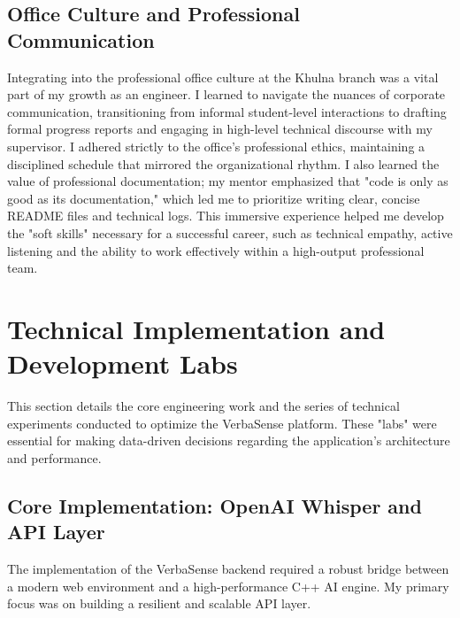 \documentclass[oneside]{thesis-library}
\begin{document}
\subsection{Office Culture and Professional Communication}
Integrating into the professional office culture at the Khulna branch was a vital part of my growth as an engineer. I learned to navigate the nuances of corporate communication, transitioning from informal student-level interactions to drafting formal progress reports and engaging in high-level technical discourse with my supervisor. I adhered strictly to the office’s professional ethics, maintaining a disciplined schedule that mirrored the organizational rhythm. I also learned the value of professional documentation; my mentor emphasized that "code is only as good as its documentation," which led me to prioritize writing clear, concise README files and technical logs. This immersive experience helped me develop the "soft skills" necessary for a successful career, such as technical empathy, active listening and the ability to work effectively within a high-output professional team.

\section{Technical Implementation and Development Labs}
This section details the core engineering work and the series of technical experiments conducted to optimize the VerbaSense platform. These "labs" were essential for making data-driven decisions regarding the application's architecture and performance.

\subsection{Core Implementation: OpenAI Whisper and API Layer}
The implementation of the VerbaSense backend required a robust bridge between a modern web environment and a high-performance C++ AI engine. My primary focus was on building a resilient and scalable API layer.
\end{document}
